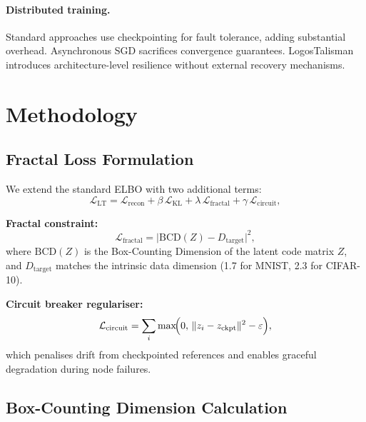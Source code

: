 \documentclass{article}
\begin{document}
\paragraph{Distributed training.}
Standard approaches \citep{dean2012large} use checkpointing for fault
tolerance, adding substantial overhead.  Asynchronous SGD
\citep{recht2011hogwild} sacrifices convergence guarantees.  LogosTalisman
introduces architecture-level resilience without external recovery
mechanisms.

\section{Methodology}
\label{sec:method}

\subsection{Fractal Loss Formulation}

We extend the standard ELBO with two additional terms:
\begin{equation}
  \mathcal{L}_{\mathrm{LT}} =
    \mathcal{L}_{\mathrm{recon}}
    + \beta\,\mathcal{L}_{\mathrm{KL}}
    + \lambda\,\mathcal{L}_{\mathrm{fractal}}
    + \gamma\,\mathcal{L}_{\mathrm{circuit}},
  \label{eq:lt_loss}
\end{equation}

\noindent\textbf{Fractal constraint:}
\begin{equation}
  \mathcal{L}_{\mathrm{fractal}} =
    \bigl|\mathrm{BCD}(Z) - D_{\mathrm{target}}\bigr|^{2},
  \label{eq:fractal}
\end{equation}
where $\mathrm{BCD}(Z)$ is the Box-Counting Dimension of the latent code
matrix $Z$, and $D_{\mathrm{target}}$ matches the intrinsic data dimension
(1.7 for MNIST, 2.3 for CIFAR-10).

\noindent\textbf{Circuit breaker regulariser:}
\begin{equation}
  \mathcal{L}_{\mathrm{circuit}} =
    \sum_{i} \max\!\Bigl(0,\,
      \|z_i - z_{\mathrm{ckpt}}\|^{2} - \varepsilon\Bigr),
  \label{eq:circuit}
\end{equation}
which penalises drift from checkpointed references and enables graceful
degradation during node failures.

\subsection{Box-Counting Dimension Calculation}
\end{document}
